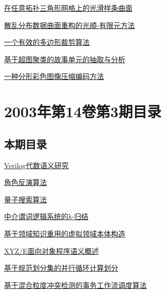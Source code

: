 \documentclass[a4paper]{article}
\begin{document}
\href{http://www.jos.org.cn/ch/reader/download_pdf.aspx?file_no=20030417&year_id=2003&quarter_id=4&falg=1}{在任意拓扑三角形网格上的光滑样条曲面}

\href{http://www.jos.org.cn/ch/reader/download_pdf.aspx?file_no=20030418&year_id=2003&quarter_id=4&falg=1}{散乱分布数据曲面重构的光顺-有限元方法}

\href{http://www.jos.org.cn/ch/reader/download_pdf.aspx?file_no=20030419&year_id=2003&quarter_id=4&falg=1}{一个有效的多边形裁剪算法}

\href{http://www.jos.org.cn/ch/reader/download_pdf.aspx?file_no=20030420&year_id=2003&quarter_id=4&falg=1}{基于超图聚类的故事单元的抽取与分析}

\href{http://www.jos.org.cn/ch/reader/download_pdf.aspx?file_no=20030421&year_id=2003&quarter_id=4&falg=1}{一种分形彩色图像压缩编码方法}


\section{\textbf{2003年第14卷第3期目录}}
\subsection{本期目录}
\href{http://www.jos.org.cn/ch/reader/download_pdf.aspx?file_no=20030301&year_id=2003&quarter_id=3&falg=1}{Verilog代数语义研究}

\href{http://www.jos.org.cn/ch/reader/download_pdf.aspx?file_no=20030302&year_id=2003&quarter_id=3&falg=1}{角色反演算法}

\href{http://www.jos.org.cn/ch/reader/download_pdf.aspx?file_no=20030303&year_id=2003&quarter_id=3&falg=1}{量子搜索算法}

\href{http://www.jos.org.cn/ch/reader/download_pdf.aspx?file_no=20030304&year_id=2003&quarter_id=3&falg=1}{中介谓词逻辑系统的λ-归结}

\href{http://www.jos.org.cn/ch/reader/download_pdf.aspx?file_no=20030305&year_id=2003&quarter_id=3&falg=1}{基于领域知识重用的虚拟领域本体构造}

\href{http://www.jos.org.cn/ch/reader/download_pdf.aspx?file_no=20030306&year_id=2003&quarter_id=3&falg=1}{XYZ/E面向对象程序语义概述}

\href{http://www.jos.org.cn/ch/reader/download_pdf.aspx?file_no=20030307&year_id=2003&quarter_id=3&falg=1}{基于规范划分集的并行循环计算划分}

\href{http://www.jos.org.cn/ch/reader/download_pdf.aspx?file_no=20030308&year_id=2003&quarter_id=3&falg=1}{基于混合粒度冲突检测的事务工作流调度算法}
\end{document}
